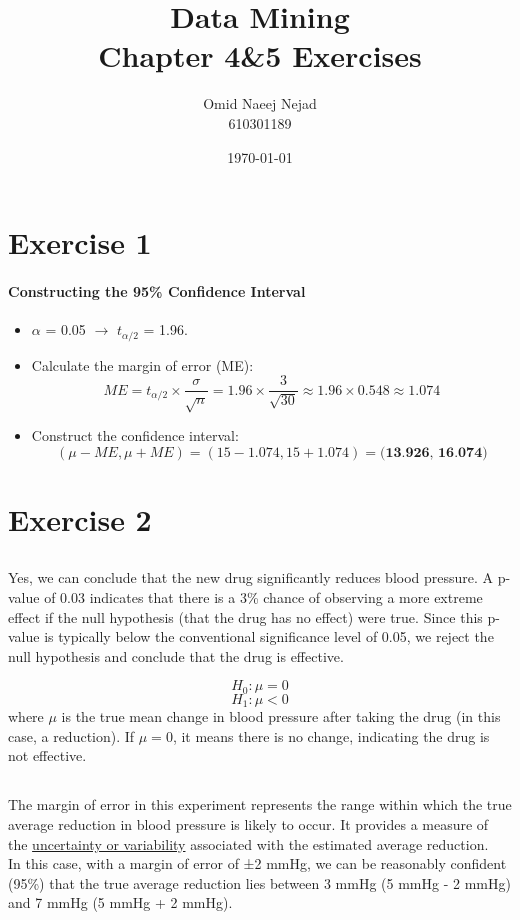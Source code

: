 \documentclass[12pt]{article}
\title{Data Mining \\ Chapter 4\&5 Exercises}
\date{\today}
\author{Omid Naeej Nejad \\ 610301189}
\begin{document}
	\maketitle
	\section{Exercise 1}	
		\paragraph{Constructing the 95\% Confidence Interval}
			\begin{itemize}
				\item $\alpha$ = 0.05 $\rightarrow$ $t_{\alpha/2}$ = 1.96.

				\item Calculate the margin of error (ME):
				\[
				ME = t_{\alpha/2} \times \frac{\sigma}{\sqrt{n}} = 1.96 \times \frac{3}{\sqrt{30}} \approx 1.96 \times 0.548 \approx 1.074
				\]
				
				\item Construct the confidence interval:\\
				\[
				(\mu - ME, \mu + ME) = (15 - 1.074, 15 + 1.074) = \textbf{(13.926, 16.074)}
				\]
				\end{itemize}	
	\section{Exercise 2}
	\subsection{}
		Yes, we can conclude that the new drug significantly reduces blood pressure. A p-value of 0.03 indicates that there is a 3\% chance of observing  a more extreme effect if the null hypothesis (that the drug has no effect) were true. Since this p-value is typically below the conventional significance level of 0.05, we reject the null hypothesis and conclude that the drug is effective.
		
		\[
		H_0: \mu=0 
		\]
		\[
		H_1: \mu < 0
		\]
		where $\mu$ is the true mean change in blood pressure after taking the drug (in this case, a reduction). If $\mu=0$, it means there is no change, indicating the drug is not effective.
		
	\subsection{}
		The margin of error in this experiment represents the range within which the true average reduction in blood pressure is likely to occur. It provides a measure of the \underline{uncertainty or variability} associated with the estimated average reduction.\\
		In this case, with a margin of error of ±2 mmHg, we can be reasonably confident (95\%) that the true average reduction lies between 3 mmHg (5 mmHg - 2 mmHg) and 7 mmHg (5 mmHg + 2 mmHg).
\end{document}
